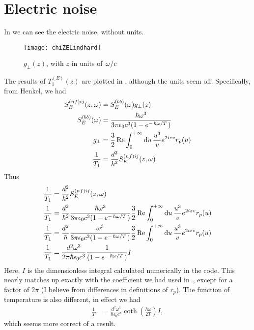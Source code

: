 \documentclass[11pt]{article}
\begin{document}
	\section{Electric noise} \label{sec:ElectricNoise}
	In  we can see the electric noise, without units.
	\begin{figure}[htp]
		\centering
		\texttt{[image: chiZELindhard]}
		\caption{$g_{\perp}(z)$, with $z$ in units of $\flatfrac{\omega}{c}$} \label{fig:chizee}
	\end{figure}

	The results of $T_1^{(E)}(z)$ are plotted in , although the units seem off.
	Specifically, from Henkel\supercite{Henkel1999}, we had
	\begin{align}
		S^{(nf)ij}_E(z, \omega) &= S^{(bb)}_E(\omega) g_{\perp}(z) \\
		S^{(bb)}_E(\omega) &= \frac{\hbar \omega^3}{3 \pi \epsilon_0 c^3 (1 - e^{-\flatfrac{\hbar \omega}{T}})} \\
		g_\perp &= \frac32 \Re \int_0^{+\infty} \dd{u} \frac{u^3}{v} e^{2 i z v} r_p(u) \\
		\frac{1}{T_1} &= \frac{d^2}{\hbar^2} S^{(nf)ij}_E(z, \omega)
	\end{align}
	Thus
	\begin{align}
		\frac{1}{T_1} &= \frac{d^2}{\hbar^2} S^{(nf)ij}_E(z, \omega) \\
		\frac{1}{T_1} &= \frac{d^2}{\hbar^2} \frac{\hbar \omega^3}{3 \pi \epsilon_0 c^3 (1 - e^{-\flatfrac{\hbar \omega}{T}})} \frac32 \Re \int_0^{+\infty} \dd{u} \frac{u^3}{v} e^{2 i z v} r_p(u) \\
		\frac{1}{T_1} &= \frac{d^2}{\hbar} \frac{\omega^3}{3 \pi \epsilon_0 c^3 (1 - e^{-\flatfrac{\hbar \omega}{T}})} \frac32 \Re \int_0^{+\infty} \dd{u} \frac{u^3}{v} e^{2 i z v} r_p(u) \\
		\frac{1}{T_1} &= \frac{d^2 \omega^3}{2 \pi \hbar \epsilon_0 c^3} \frac{1}{(1 - e^{-\flatfrac{\hbar \omega}{T}})} I
	\end{align}
	Here, $I$ is the dimensionless integral calculated numerically in the code.
	This nearly matches up exactly with the coefficient we had used in~\cite{QubitRelax}, except for a factor of $2\pi$ (I believe from differences in definitions of $r_p$).
	The function of temperature is also different, in effect we had
	\begin{align}
		\frac{1}{T} &= \frac{d^2 \omega^3}{\hbar \epsilon_0 c^3} \coth(\frac{\hbar \omega}{2 T}) I, \label{eq:actualTime}
	\end{align}
	which seems more correct of a result.
\end{document}

